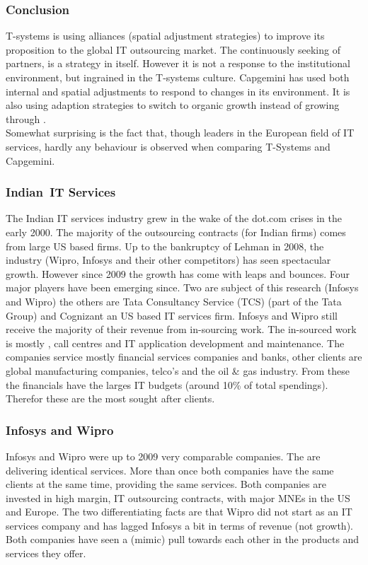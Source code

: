 \subsubsection{Conclusion}
T-systems is using alliances (spatial adjustment strategies) to improve its proposition to the global IT outsourcing market. 
The continuously seeking of partners, is a strategy in itself.
However it is not a response to the institutional environment, but ingrained in the T-systems culture.
Capgemini has used both internal and spatial adjustments to respond to changes in its environment.
It is also using adaption strategies to switch to organic growth instead of growing through \acq.\\
Somewhat surprising is the fact that, though leaders in the European field of IT services, hardly any \iso behaviour is observed when comparing T-Systems and Capgemini.

\subsubsection[Indian IT Services]{Indian~\gls{IT} Services}

The Indian IT services industry grew in the wake of the dot.com crises in the early 2000. 
The majority of the outsourcing contracts (for Indian firms) comes from large US based firms.
Up to the bankruptcy of Lehman in 2008, the industry (Wipro, Infosys and their other competitors) has seen spectacular growth. 
However since 2009 the growth has come with leaps and bounces.
Four major players have been emerging since.
Two are subject of this research (Infosys and Wipro) the others are Tata Consultancy Service (TCS) (part of the Tata Group) and Cognizant an US based IT services firm.
Infosys and Wipro still receive the majority of their revenue from in-sourcing work.
The in-sourced work is mostly , call centres and \gls{IT} application development and maintenance.
The companies service mostly financial services companies and banks, other clients are global manufacturing companies, telco's and the oil \& gas industry.
From these the financials have the larges IT budgets (around 10\% of total spendings).
Therefor these are the most sought after clients.

\subsubsection{Infosys and Wipro}

Infosys and Wipro were up to 2009 very comparable companies.
The are delivering identical services. 
More than once both companies have the same clients at the same time, providing the same services.
Both companies are invested in high margin, IT outsourcing contracts, with major MNEs in the US and Europe.
The two differentiating facts are that Wipro did not start as an IT services company and has lagged Infosys a bit in terms of revenue (not growth).
Both companies have seen a (mimic) \iso pull towards each other in the products and services they offer.

